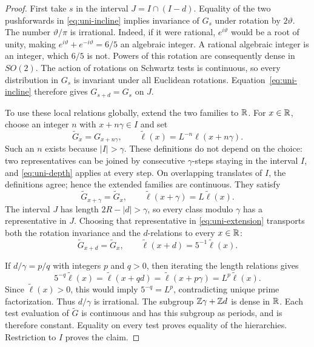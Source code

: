 \begin{proof}
First take $s$ in the interval $J=I\cap(I-d)$.  Equality of the two
pushforwards in \eqref{eq:uni-incline} implies invariance of $G_s$
under rotation by $2\vartheta$.  The number $\vartheta/\pi$ is
irrational.  Indeed, if it were rational, $e^{i\vartheta}$ would be a
root of unity, making
$e^{i\vartheta}+e^{-i\vartheta}=6/5$ an algebraic integer.  A rational
algebraic integer is an integer, which $6/5$ is not.  Powers of this
rotation are consequently dense in $SO(2)$.  The action of rotations
on Schwartz tests is continuous, so every distribution in $G_s$ is
invariant under all Euclidean rotations.  Equation~\eqref{eq:uni-incline}
therefore gives $G_{s+d}=G_s$ on $J$.

To use these local relations globally, extend the two families to
$\mathbb R$.  For $x\in\mathbb R$, choose an integer $n$ with $x+n\gamma\in I$ and
set
\begin{equation}\label{eq:uni-extension}
 \widetilde G_x=G_{x+n\gamma},\qquad
 \widetilde\ell(x)=L^{-n}\ell(x+n\gamma).
\end{equation}
Such an $n$ exists because $|I|>\gamma$.  These definitions do not
depend on the choice: two representatives can be joined by consecutive
$\gamma$-steps staying in the interval $I$, and
\eqref{eq:uni-depth} applies at every step.  On overlapping translates
of $I$, the definitions agree; hence the extended families are continuous.
They satisfy
\[
 \widetilde G_{x+\gamma}=\widetilde G_x,
 \qquad \widetilde\ell(x+\gamma)=L\widetilde\ell(x).
\]
The interval $J$ has length $2R-|d|>\gamma$, so every class modulo
$\gamma$ has a representative in $J$.  Choosing that representative in
\eqref{eq:uni-extension} transports both the rotation invariance and
the $d$-relations to every $x\in\mathbb R$:
\begin{equation}\label{eq:uni-global-periods}
 \widetilde G_{x+d}=\widetilde G_x,
 \qquad \widetilde\ell(x+d)=5^{-1}\widetilde\ell(x).
\end{equation}

If $d/\gamma=p/q$ with integers $p$ and $q>0$, then iterating the
length relations gives
\[
 5^{-q}\widetilde\ell(x)
 =\widetilde\ell(x+qd)
 =\widetilde\ell(x+p\gamma)
 =L^p\widetilde\ell(x).
\]
Since $\widetilde\ell(x)>0$, this would imply $5^{-q}=L^p$,
contradicting unique prime factorization.  Thus $d/\gamma$ is irrational.
The subgroup $\mathbb Z\gamma+\mathbb Z d$ is dense in $\mathbb R$.  Each test evaluation
of $\widetilde G$ is continuous and has this subgroup as periods, and
is therefore constant.  Equality on every test proves equality of the
hierarchies.  Restriction to $I$ proves the claim.
\end{proof}

